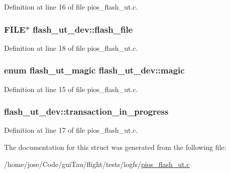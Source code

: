 Definition at line 16 of file pios\-\_\-flash\-\_\-ut.\-c.

\hypertarget{structflash__ut__dev_ab7546f7aa05d2a2a0eb9ce54b9d4620a}{
\subsubsection[{flash\-\_\-file}]{\setlength{\rightskip}{0pt plus 5cm}F\-I\-L\-E$\ast$ flash\-\_\-ut\-\_\-dev\-::flash\-\_\-file}}\label{structflash__ut__dev_ab7546f7aa05d2a2a0eb9ce54b9d4620a}


Definition at line 18 of file pios\-\_\-flash\-\_\-ut.\-c.

\hypertarget{structflash__ut__dev_aefafb502345249d19bb9b82d91e1a4a7}{
\subsubsection[{magic}]{\setlength{\rightskip}{0pt plus 5cm}enum {\bf flash\-\_\-ut\-\_\-magic} flash\-\_\-ut\-\_\-dev\-::magic}}\label{structflash__ut__dev_aefafb502345249d19bb9b82d91e1a4a7}


Definition at line 15 of file pios\-\_\-flash\-\_\-ut.\-c.

\hypertarget{structflash__ut__dev_a326284da380f2645162916c9bd58625b}{
\subsubsection[{transaction\-\_\-in\-\_\-progress}]{ flash\-\_\-ut\-\_\-dev\-::transaction\-\_\-in\-\_\-progress}}\label{structflash__ut__dev_a326284da380f2645162916c9bd58625b}


Definition at line 17 of file pios\-\_\-flash\-\_\-ut.\-c.



The documentation for this struct was generated from the following file\-:\begin{DoxyCompactItemize}
\item 
/home/jose/\-Code/gui\-Tau/flight/tests/logfs/\hyperlink{pios__flash__ut_8c}{pios\-\_\-flash\-\_\-ut.\-c}\end{DoxyCompactItemize}
